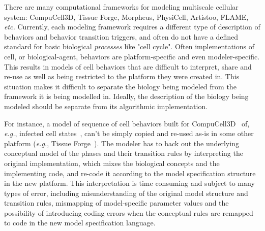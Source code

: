 There are many computational frameworks for modeling multiscale cellular system: CompuCell3D, Tissue Forge, Morpheus, PhysiCell, Artistoo, FLAME, \textit{etc.}
Currently, each modeling framework requires a different type of description of behaviors and behavior transition triggers, and often do not have a defined standard for basic biological \textit{processes} like "cell cycle". Often implementations of cell, or biological-agent, behaviors are platform-specific and even modeler-specific. This results in models of cell behaviors that are difficult to interpret, share and re-use as well as being restricted to the platform they were created in. This situation makes it difficult to separate the biology being modeled from the framework it is being modelled in. Ideally, the description of the biology being modeled should be separate from its algorithmic implementation.

For instance, a model of sequence of cell behaviors built for CompuCell3D~\cite{swat_multi-scale_2012} of, \textit{e.g.}, infected cell states~\cite{sego_modular_2020}, can't be simply copied and re-used as-is in some other platform (\textit{e.g.}, Tissue Forge~\cite{sego_tissue_2022}). The modeler has to back out the underlying conceptual model of the phases and their transition rules by interpreting the original implementation, which mixes the biological concepts and the implementing code, and re-code it according to the model specification structure in the new platform. This interpretation is time consuming and subject to many types of error, including misunderstanding of the original model structure and transition rules, mismapping of model-specific parameter values and the possibility of introducing coding errors when the conceptual rules are remapped to code in the new model specification language.


